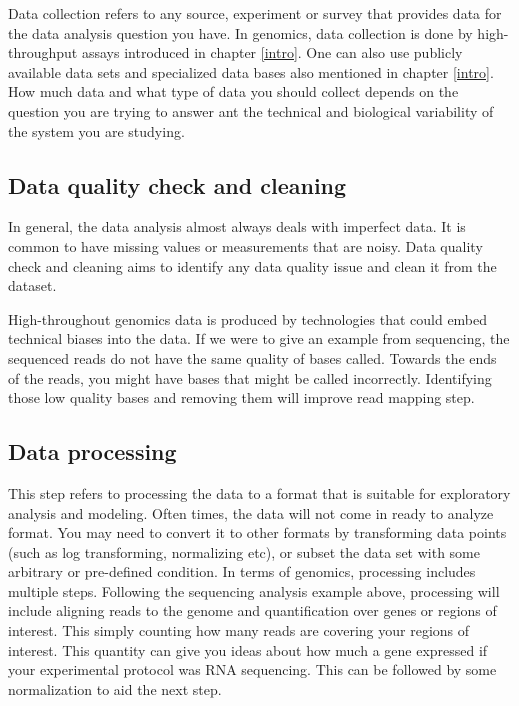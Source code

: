\documentclass[12pt,]{krantz}
\theoremstyle{definition}
\theoremstyle{definition}
\theoremstyle{definition}
\theoremstyle{remark}
\begin{document}
Data collection refers to any source, experiment or survey that provides
data for the data analysis question you have. In genomics, data
collection is done by high-throughput assays introduced in chapter
\ref{intro}. One can also use publicly available data sets and
specialized data bases also mentioned in chapter \ref{intro}. How much
data and what type of data you should collect depends on the question
you are trying to answer ant the technical and biological variability of
the system you are studying.

\hypertarget{data-quality-check-and-cleaning}{%
\subsection{Data quality check and
cleaning}\label{data-quality-check-and-cleaning}}

In general, the data analysis almost always deals with imperfect data.
It is common to have missing values or measurements that are noisy. Data
quality check and cleaning aims to identify any data quality issue and
clean it from the dataset.

High-throughout genomics data is produced by technologies that could
embed technical biases into the data. If we were to give an example from
sequencing, the sequenced reads do not have the same quality of bases
called. Towards the ends of the reads, you might have bases that might
be called incorrectly. Identifying those low quality bases and removing
them will improve read mapping step.

\hypertarget{data-processing}{%
\subsection{Data processing}\label{data-processing}}

This step refers to processing the data to a format that is suitable for
exploratory analysis and modeling. Often times, the data will not come
in ready to analyze format. You may need to convert it to other formats
by transforming data points (such as log transforming, normalizing etc),
or subset the data set with some arbitrary or pre-defined condition. In
terms of genomics, processing includes multiple steps. Following the
sequencing analysis example above, processing will include aligning
reads to the genome and quantification over genes or regions of
interest. This simply counting how many reads are covering your regions
of interest. This quantity can give you ideas about how much a gene
expressed if your experimental protocol was RNA sequencing. This can be
followed by some normalization to aid the next step.
\end{document}
